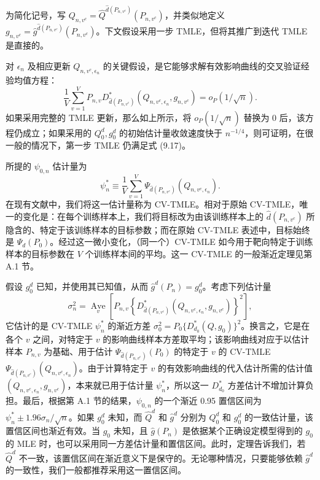为简化记号，写 $Q_{n,v^c}=\hat Q^{\hat d(P_{n,v^c})}(P_{n,v^c})$，并类似地定义 $g_{n,v^c}=\hat g^{\hat d(P_{n,v^c})}(P_{n,v^c})$。下文假设采用一步 TMLE，但将其推广到迭代 TMLE 是直接的。

对 $\epsilon_n$ 及相应更新 $Q_{n,v^c,\epsilon_n}$ 的关键假设，是它能够求解有效影响曲线的交叉验证经验均值方程：
\begin{equation}
\frac1V\sum_{v=1}^V P_{n,v}
D^*_{\hat d(P_{n,v^c})}(Q_{n,v^c,\epsilon_n},g_{n,v^c})
=o_P(1/\sqrt n).
\tag{9.17}
\end{equation}
如果采用完整的 TMLE 更新，那么如上所示，将 $o_P(1/\sqrt n)$ 替换为 0 后，该方程仍成立；如果采用的 $Q_0^d,g_0^d$ 的初始估计量收敛速度快于 $n^{-1/4}$，则可证明，在很一般的情况下，第一步 TMLE 仍满足式 (9.17)。

所提的 $\psi_{0,n}$ 估计量为
\[
\psi_n^*\equiv\frac1V\sum_{v=1}^V
\Psi_{\hat d(P_{n,v^c})}(Q_{n,v^c,\epsilon_n}).
\]
在现有文献中，我们将这一估计量称为 CV-TMLE。相对于原始 CV-TMLE，唯一的变化是：在每个训练样本上，我们将目标改为由该训练样本上的 $\hat d(P_{n,v^c})$ 所隐含的、特定于该训练样本的目标参数；而在原始 CV-TMLE 表述中，目标始终是 $\Psi_d(P_0)$。经过这一微小变化，（同一个）CV-TMLE 如今用于靶向特定于训练样本的目标参数在 $V$ 个训练样本间的平均。这一 CV-TMLE 的一般渐近定理见第 A.1 节。

假设 $g_0^d$ 已知，并使用其已知值，从而 $\hat g^d(P_n)=g_0^d$。考虑下列估计量
\begin{equation}
\sigma_n^2=\underset{v}{\operatorname{Ave}}\left[
P_{n,v}\left\{D^*_{\hat d(P_{n,v^c})}(Q_{n,v^c,\epsilon_n},g_{n,v^c})\right\}^2\right],
\tag{9.18}
\end{equation}
它估计的是 CV-TMLE $\psi_n^*$ 的渐近方差 $\sigma_0^2=P_0\{D^*_{d_0}(Q,g_0)\}^2$。换言之，它是在各个 $v$ 之间，对特定于 $v$ 的影响曲线样本方差取平均；该影响曲线对应于以估计样本 $P_{n,v}$ 为基础、用于估计 $\Psi_{\hat d(P_{n,v^c})}(P_0)$ 的特定于 $v$ 的 CV-TMLE $\Psi_{\hat d(P_{n,v^c})}(Q_{n,v^c,\epsilon_n})$。由于计算特定于 $v$ 的有效影响曲线的代入估计所需的估计值 $(Q_{n,v^c,\epsilon_n},g_{n,v^c})$，本来就已用于估计量 $\psi_n^*$，所以这一 $D^*_{d_0}$ 方差估计不增加计算负担。最后，根据第 A.1 节的结果，$\psi_{0,n}$ 的一个渐近 0.95 置信区间为 $\psi_n^*\pm1.96\sigma_n/\sqrt n$。如果 $g_0^d$ 未知，而 $\hat Q^d$ 和 $\hat g^d$ 分别为 $Q_0^d$ 和 $g_0^d$ 的一致估计量，该置信区间也渐近有效。当 $g_0$ 未知，且 $\hat g(P_n)$ 是依据某个正确设定模型得到的 $g_0$ 的 MLE 时，也可以采用同一方差估计量和置信区间。此时，定理告诉我们，若 $\hat Q^d$ 不一致，该置信区间在渐近意义下是保守的。无论哪种情况，只要能够依赖 $\hat g^d$ 的一致性，我们一般都推荐采用这一置信区间。
